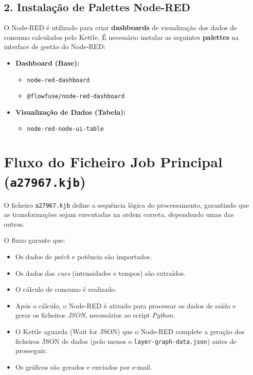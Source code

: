 \documentclass[a4paper, 12pt]{article}
\begin{document}
	\subsection{2. Instalação de Palettes Node-RED}
	O Node-RED é utilizado para criar \textbf{dashboards} de visualização dos dados de consumo calculados pelo Kettle. É necessário instalar as seguintes \textbf{palettes} na interface de gestão do Node-RED:
	\begin{itemize}
		\item \textbf{Dashboard (Base):} 
		\begin{itemize}
			\item \texttt{node-red-dashboard}
			\item \texttt{@flowfuse/node-red-dashboard}
		\end{itemize}
		\item \textbf{Visualização de Dados (Tabela):} 
		\begin{itemize}
			\item \texttt{node-red-node-ui-table}
		\end{itemize}
	\end{itemize}
	
	
	\section{Fluxo do Ficheiro Job Principal (\texttt{a27967.kjb})}
	
	O ficheiro \texttt{a27967.kjb} define a sequência lógica do processamento, garantindo que as transformações sejam executadas na ordem correta, dependendo umas das outras.
	
	O fluxo garante que:
	\begin{itemize}
		\item Os dados de \textit{patch} e potência são importados.
		\item Os dados das \textit{cues} (intensidades e tempos) são extraídos.
		\item O cálculo de consumo é realizado.
		\item Após o cálculo, o Node-RED é ativado para processar os dados de saída e gerar os ficheiros \textit{JSON}, necessários ao script \textit{Python}.
		\item O Kettle aguarda (Wait for JSON) que o Node-RED complete a geração dos ficheiros JSON de dados (pelo menos o \texttt{layer-graph-data.json}) antes de prosseguir.
		\item Os gráficos são gerados e enviados por e-mail.
	\end{itemize}
		
\end{document}
